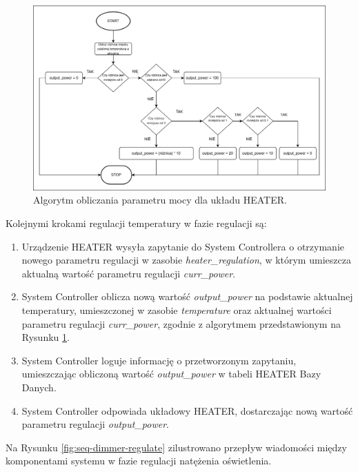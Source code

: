             \begin{figure}[H]
                \centering
                \includegraphics[width=0.8\linewidth]{graphics/heater-block-diagram.png}
                \caption{Algorytm obliczania parametru mocy dla układu HEATER.}
                \label{fig:seq-heater-algo}
            \end{figure}

            Kolejnymi krokami regulacji temperatury w fazie regulacji są:
            \begin{enumerate}
                \item Urządzenie HEATER wysyła zapytanie do System Controllera o otrzymanie nowego parametru regulacji w zasobie \textit{heater\_regulation}, w którym umieszcza aktualną wartość parametru regulacji \textit{curr\_power}.
                \item System Controller oblicza nową wartość \textit{output\_power} na podstawie aktualnej temperatury, umieszczonej w zasobie \textit{temperature} oraz aktualnej wartości parametru regulacji \textit{curr\_power}, zgodnie z algorytmem przedstawionym na Rysunku \ref{fig:seq-heater-algo}.
                \item System Controller loguje informację o przetworzonym zapytaniu, umieszczając obliczoną wartość \textit{output\_power} w tabeli HEATER Bazy Danych.
                \item System Controller odpowiada układowy HEATER, dostarczając nową wartość parametru regulacji \textit{output\_power}.
            \end{enumerate}

            Na Rysunku \ref{fig:seq-dimmer-regulate} zilustrowano przepływ wiadomości między komponentami systemu w fazie regulacji natężenia oświetlenia.

